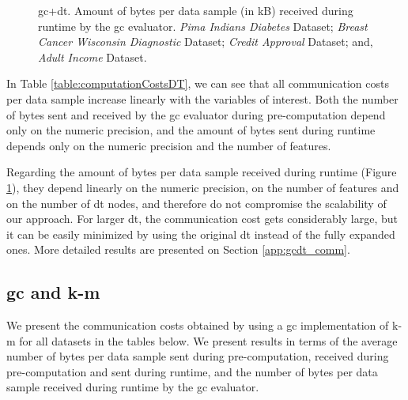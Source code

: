 \begin{figure}[!h]
\caption[\acs{gc}+\acs{dt}. Amount of bytes per data sample (in kB) received during runtime by the \ac{gc} evaluator. All datasets.]{\acs{gc}+\acs{dt}. Amount of bytes per data sample (in kB) received during runtime by the \ac{gc} evaluator.
 \emph{Pima Indians Diabetes} Dataset;
 \emph{Breast Cancer Wisconsin Diagnostic} Dataset;
 \emph{Credit Approval} Dataset; and,
 \emph{Adult Income} Dataset.}%
\label{fig:dt-gc-comm}%
\end{figure}

In Table \ref{table:computationCostsDT}, we can see that all communication costs per data sample increase linearly with the variables of interest. Both the number of bytes sent and received by the \ac{gc} evaluator during pre-computation depend only on the numeric precision, and the amount of bytes sent during runtime depends only on the numeric precision and the number of features.

Regarding the amount of bytes per data sample received during runtime (Figure \ref{fig:dt-gc-comm}), they depend linearly on the numeric precision, on the number of features and on the number of \ac{dt} nodes, and therefore do not compromise the scalability of our approach. For larger \ac{dt}, the communication cost gets considerably large, but it can be easily minimized by using the original \ac{dt} instead of the fully expanded ones. More detailed results are presented on Section \ref{app:gcdt_comm}.




\subsection{\acl{gc} and \acl{k-m}}

We present the communication costs obtained by using a \ac{gc} implementation of \ac{k-m} for all datasets in the tables below. We present results in terms of the average number of bytes per data sample sent during pre-computation, received during pre-computation and sent during runtime, and the number of bytes per data sample received during runtime by the \ac{gc} evaluator. 


